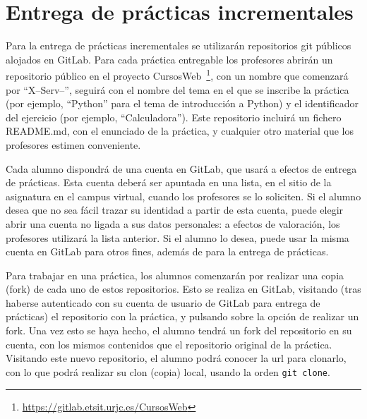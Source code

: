 

\section{Entrega de prácticas incrementales}
\label{sec:eje-entrega-practicas-incr}

Para la entrega de prácticas incrementales se utilizarán repositorios git públicos alojados en GitLab. Para cada práctica entregable los profesores abrirán un repositorio público en el proyecto CursosWeb~\footnote{\url{https://gitlab.etsit.urjc.es/CursosWeb}}, con un nombre que comenzará por ``X--Serv--'', seguirá con el nombre del tema en el que se inscribe la práctica (por ejemplo, ``Python'' para el tema de introducción a Python) y el identificador del ejercicio (por ejemplo, ``Calculadora''). Este repositorio incluirá un fichero README.md, con el enunciado de la práctica, y cualquier otro material que los profesores estimen conveniente.

Cada alumno dispondrá de una cuenta en GitLab, que usará a efectos de entrega de prácticas. Esta cuenta deberá ser apuntada en una lista, en el sitio de la asignatura en el campus virtual, cuando los profesores se lo soliciten. Si el alumno desea que no sea fácil trazar su identidad a partir de esta cuenta, puede elegir abrir una cuenta no ligada a sus datos personales: a efectos de valoración, los profesores utilizará la lista anterior. Si el alumno lo desea, puede usar la misma cuenta en GitLab para otros fines, además de para la entrega de prácticas.

Para trabajar en una práctica, los alumnos comenzarán por realizar una copia (fork) de cada uno de estos repositorios. Esto se realiza en GitLab, visitando (tras haberse autenticado con su cuenta de usuario de GitLab para entrega de prácticas) el repositorio con la práctica, y pulsando sobre la opción de realizar un fork. Una vez esto se haya hecho, el alumno tendrá un fork del repositorio en su cuenta, con los mismos contenidos que el repositorio original de la práctica. Visitando este nuevo repositorio, el alumno podrá conocer la url para clonarlo, con lo que podrá realizar su clon (copia) local, usando la orden \verb|git clone|.

